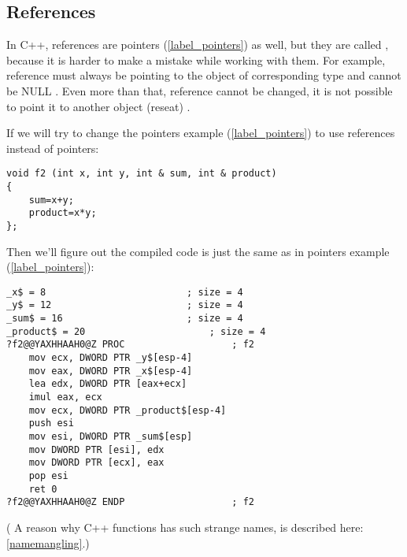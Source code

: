 ﻿\subsection{References}
\label{cpp_references}

{In C++, references are pointers (\ref{label_pointers}) as well, but they are called , because it is harder to make a mistake while
working with them}\cite[8.3.2]{CPP11}.
{For example, reference must always be pointing to the object of corresponding type and cannot be NULL}
\cite[8.6]{ParashiftCPPFAQ}.
{Even more than that, reference cannot be changed, it is not possible to point it to another object (reseat)}
\cite[8.5]{ParashiftCPPFAQ}.

{If we will try to change the pointers example (\ref{label_pointers}) to use references instead of pointers:}

\begin{lstlisting}
void f2 (int x, int y, int & sum, int & product)
{
	sum=x+y;
	product=x*y;
};
\end{lstlisting}

{Then we'll figure out the compiled code is just the same 
as in pointers example (\ref{label_pointers}):}

\begin{lstlisting}[caption=\Optimizing MSVC 2010]
_x$ = 8							; size = 4
_y$ = 12						; size = 4
_sum$ = 16						; size = 4
_product$ = 20						; size = 4
?f2@@YAXHHAAH0@Z PROC					; f2
	mov	ecx, DWORD PTR _y$[esp-4]
	mov	eax, DWORD PTR _x$[esp-4]
	lea	edx, DWORD PTR [eax+ecx]
	imul eax, ecx
	mov ecx, DWORD PTR _product$[esp-4]
	push esi
	mov	esi, DWORD PTR _sum$[esp]
	mov	DWORD PTR [esi], edx
	mov	DWORD PTR [ecx], eax
	pop	esi
	ret	0
?f2@@YAXHHAAH0@Z ENDP					; f2
\end{lstlisting}

(
{A reason why C++ functions has such strange names, is described here}: \ref{namemangling}.)
